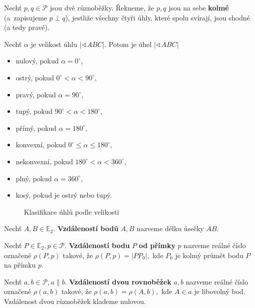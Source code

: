 \begin{definition}
  Nechť $p,q\in \mathscr P$ jsou dvě různoběžky. Řekneme, že $p,q$ jsou na sebe \textbf{kolmé} (a~zapisujeme $p\perp q$), jestliže všechny čtyři úhly, které spolu svírají, jsou shodné (a tedy pravé).
\end{definition}

\begin{pozn}
  Nechť $\alpha$ je velikost úhlu $|\sphericalangle ABC|$. Potom je úhel $|\sphericalangle ABC|$
  \begin{itemize}
    \item nulový, pokud $\alpha=0^\circ$,
  \item ostrý, pokud $0^\circ <\alpha < 90^\circ,$
  \item pravý, pokud $\alpha = 90^\circ,$
  \item tupý, pokud $90^\circ < \alpha < 180^\circ,$
  \item přímý, pokud $\alpha = 180^\circ,$
  \item konvexní, pokud $0^\circ \leq \alpha \leq 180^\circ,$
  \item nekonvexní, pokud $180^\circ < \alpha < 360^\circ$,
  \item plný, pokud $\alpha = 360^\circ,$
  \item kosý, pokud je ostrý nebo tupý.
  \end{itemize}

  \begin{figure}[ht!]
    \centering
    \caption{Klasifikace úhlů podle velikosti}
  \end{figure}
\end{pozn}

\begin{definition}
  Nechť $A,B\in \mathbb E_2$. \textbf{Vzdáleností bodů} $A,B$ nazveme délku úsečky $AB.$
\end{definition}


\begin{definition}
  Nechť $P\in \mathbb E_2, p \in \mathscr P.$ \textbf{Vzdáleností bodu} $P$ \textbf{od přímky} $p$ nazveme reálné číslo označené $\rho(P,p)$ takové, že $\rho(P,p)=|PP_0|,$ kde $P_0$ je kolmý průmět bodu $P$ na přímku $p$.
\end{definition}

\begin{definition}
  Nechť $a,b \in \mathscr P, a \parallel b.$ \textbf{Vzdáleností dvou rovnoběžek} $a,b$ nazveme reálné číslo označené $\rho(a,b)$ takové, že $\rho(a,b)=\rho(A,b),$ kde $A\in a$ je libovolný bod. Vzdálenost dvou různoběžek klademe nulovou.
\end{definition}

